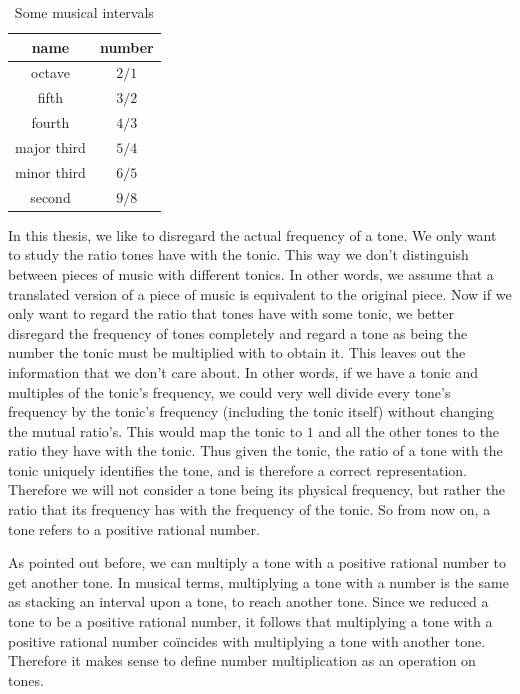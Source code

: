 \documentclass[a4paper]{book}
\theoremstyle{definition}
\begin{document}
\begin{table}[h]
    \centering
    \begin{tabular}{|c|c|}
        \hline
        name & number \\ \hline
        octave & $2/1$ \\ 
        fifth & $3/2$ \\ 
        fourth & $4/3$ \\ 
        major third & $5/4$ \\ 
        minor third & $6/5$ \\ 
        second & $9/8$ \\ 
        \hline
    \end{tabular}
    \caption{Some musical intervals}
    \label{musical_intervals}
\end{table}

In this thesis, we like to disregard the actual frequency of a tone.
We only want to study the ratio tones have with the tonic.
This way we don't distinguish between pieces of music with different tonics.
In other words, we assume that a translated version of a piece of music is equivalent to the original piece.
Now if we only want to regard the ratio that tones have with some tonic, we better disregard the frequency of tones completely and regard a tone as being the number the tonic must be multiplied with to obtain it.
This leaves out the information that we don't care about.
In other words, if we have a tonic and multiples of the tonic's frequency, we could very well divide every tone's frequency by the tonic's frequency (including the tonic itself) without changing the mutual ratio's.
This would map the tonic to $1$ and all the other tones to the ratio they have with the tonic.
Thus given the tonic, the ratio of a tone with the tonic uniquely identifies the tone, and is therefore a correct representation.
Therefore we will not consider a tone being its physical frequency, but rather the ratio that its frequency has with the frequency of the tonic.
So from now on, a tone refers to a positive rational number.

As pointed out before, we can multiply a tone with a positive rational number to get another tone.
In musical terms, multiplying a tone with a number is the same as stacking an interval upon a tone, to reach another tone.
Since we reduced a tone to be a positive rational number, it follows that multiplying a tone with a positive rational number co\"incides with multiplying a tone with another tone.
Therefore it makes sense to define number multiplication as an operation on tones.
\end{document}
